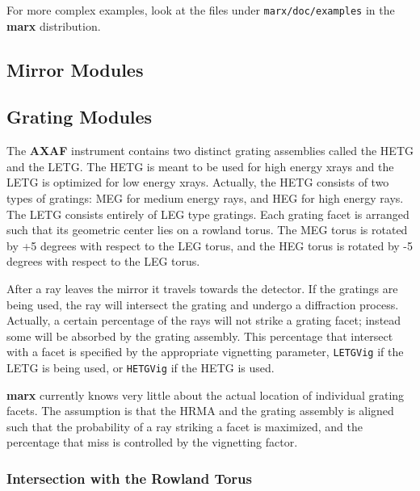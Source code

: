 \documentclass{article}
\newcommand{\AXAF}{{\bf AXAF}}
\newcommand{\marx}{{\bf marx}}
\begin{document}
 For more complex examples, look at the files under
 \verb|marx/doc/examples| in the \marx{} distribution.



\subsection{Mirror Modules}

\subsection{Grating Modules} %

 The \AXAF{} instrument contains two distinct grating assemblies
 called the HETG and the LETG.  The HETG is meant to be used for high
 energy xrays and the LETG is optimized for low energy xrays.
 Actually, the HETG consists of two types of gratings: MEG for medium
 energy rays, and HEG for high energy rays.  The LETG consists entirely
 of LEG type gratings.  Each grating facet is arranged such that its
 geometric center lies on a rowland torus.  The MEG torus is rotated
 by +5 degrees with respect to the LEG torus, and the HEG torus is
 rotated by -5 degrees with respect to the LEG torus.
 
 After a ray leaves the mirror it travels towards the detector.
 If the gratings are being used, the ray will intersect the grating
 and undergo a diffraction process.  Actually, a certain percentage of
 the rays will not strike a grating facet; instead some will be
 absorbed by the grating assembly.  This percentage that intersect
 with a facet is specified by the appropriate vignetting parameter,
 \verb|LETGVig| if the LETG is being used, or \verb|HETGVig| if the
 HETG is used.
 
 \marx{} currently knows very little about the actual location of
 individual grating facets.  The assumption is that the HRMA and the
 grating assembly is aligned such that the probability of a ray
 striking a facet is maximized, and the percentage that miss is
 controlled by the vignetting factor.
 
\subsubsection{Intersection with the Rowland Torus} %
 
\end{document}
